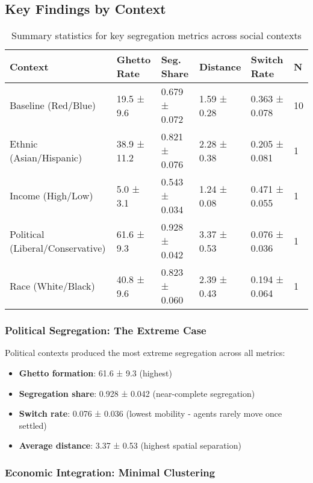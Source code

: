 \documentclass[pdflatex,sn-basic]{sn-jnl}%
\begin{document}
\subsection{Key Findings by Context}\label{key-findings-by-context}


\begin{table}[h]
\caption{Summary statistics for key segregation metrics across social contexts}
\centering
\begin{tabular}{llllll}
\hline
Context & Ghetto Rate & Seg. Share & Distance & Switch Rate & N\\
\hline
Baseline (Red/Blue) & 19.5 ± 9.6 & 0.679 ± 0.072 & 1.59 ± 0.28 & 0.363 ± 0.078 & 10\\
Ethnic (Asian/Hispanic) & 38.9 ± 11.2 & 0.821 ± 0.076 & 2.28 ± 0.38 & 0.205 ± 0.081 & 1\\
Income (High/Low) & 5.0 ± 3.1 & 0.543 ± 0.034 & 1.24 ± 0.08 & 0.471 ± 0.055 & 1\\
Political (Liberal/Conservative) & 61.6 ± 9.3 & 0.928 ± 0.042 & 3.37 ± 0.53 & 0.076 ± 0.036 & 1\\
Race (White/Black) & 40.8 ± 9.6 & 0.823 ± 0.060 & 2.39 ± 0.43 & 0.194 ± 0.064 & 1\\
\hline
\end{tabular}
\end{table}

\subsubsection{Political Segregation: The Extreme
Case}\label{political-segregation-the-extreme-case}

Political contexts produced the most extreme segregation across all
metrics: 
\begin{itemize}
\item \textbf{Ghetto formation}: 61.6 ± 9.3 (highest) 
\item \textbf{Segregation share}: 0.928 ± 0.042 (near-complete segregation) 
\item \textbf{Switch rate}: 0.076 ± 0.036 (lowest mobility - agents rarely
move once settled) 
\item \textbf{Average distance}: 3.37 ± 0.53 (highest
spatial separation)
\end{itemize}

\subsubsection{Economic Integration: Minimal
Clustering}\label{economic-integration-minimal-clustering}
\end{document}
